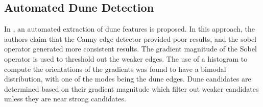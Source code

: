 \subsection{Automated Dune Detection}

In \cite{Automated-mapping-linear-dunefield-morphometric-parameters}, an automated extraction of dune features is proposed. In this approach, the authors claim that the Canny edge detector provided poor results, and the sobel operator generated more consistent results. The gradient magnitude of the Sobel operator is used to threshold out the weaker edges. The use of a histogram to compute the orientations of the gradients was found to have a bimodal distribution, with one of the modes being the dune edges. Dune candidates are determined based on their gradient magnitude which filter out weaker candidates unless they are near strong candidates.